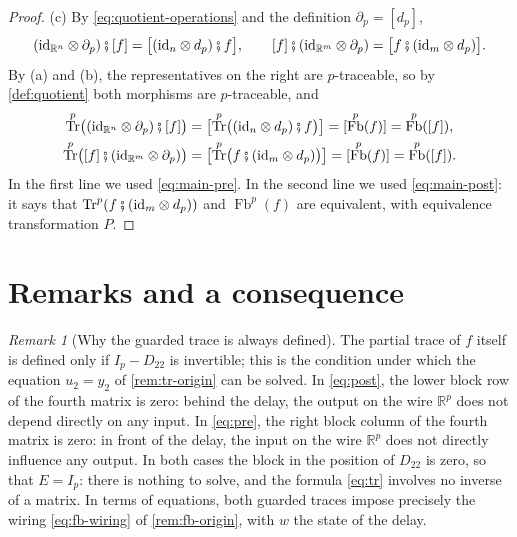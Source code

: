 \documentclass[11pt,a4paper]{article}
\theoremstyle{plain}
\theoremstyle{definition}
\theoremstyle{remark}
\newtheorem{remark}[theorem]{Remark}
\DeclareMathOperator{\Fb}{Fb}
\DeclareMathOperator{\Tr}{Tr}
\newcommand{\R}{\mathbb{R}}
\newcommand{\id}{\mathrm{id}}
\newcommand{\then}{\mathbin{\fatsemi}}
\begin{document}
\begin{proof}
    (c) By \cref{eq:quotient-operations} and the definition $\partial_p = [d_p]$,
    \begin{equation*}
        (\id_{\R^n} \otimes \partial_p) \then [f] = \bigl[ (\id_n \otimes d_p) \then f \bigr],
        \qquad
        [f] \then (\id_{\R^m} \otimes \partial_p) = \bigl[ f \then (\id_m \otimes d_p) \bigr] .
    \end{equation*}
    By (a) and (b), the representatives on the right are $p$-traceable, so by \cref{def:quotient} both morphisms are $p$-traceable, and
    \begin{align*}
        \Tr^p\bigl( (\id_{\R^n} \otimes \partial_p) \then [f] \bigr)
         & = \bigl[ \Tr^p\bigl( (\id_n \otimes d_p) \then f \bigr) \bigr]
        = [\Fb^p(f)] = \Fb^p([f]), \\
        \Tr^p\bigl( [f] \then (\id_{\R^m} \otimes \partial_p) \bigr)
         & = \bigl[ \Tr^p\bigl( f \then (\id_m \otimes d_p) \bigr) \bigr]
        = [\Fb^p(f)] = \Fb^p([f]) .
    \end{align*}
    In the first line we used \cref{eq:main-pre}.
    In the second line we used \cref{eq:main-post}: it says that $\Tr^p( f \then (\id_m \otimes d_p))$ and $\Fb^p(f)$ are equivalent, with equivalence transformation $P$.
\end{proof}

\section{Remarks and a consequence}

\begin{remark}[Why the guarded trace is always defined]
    The partial trace of $f$ itself is defined only if $I_p - D_{22}$ is invertible; this is the condition under which the equation $u_2 = y_2$ of \cref{rem:tr-origin} can be solved.
    In \cref{eq:post}, the lower block row of the fourth matrix is zero: behind the delay, the output on the wire $\R^p$ does not depend directly on any input.
    In \cref{eq:pre}, the right block column of the fourth matrix is zero: in front of the delay, the input on the wire $\R^p$ does not directly influence any output.
    In both cases the block in the position of $D_{22}$ is zero, so that $E = I_p$: there is nothing to solve, and the formula \cref{eq:tr} involves no inverse of a matrix.
    In terms of equations, both guarded traces impose precisely the wiring \cref{eq:fb-wiring} of \cref{rem:fb-origin}, with $w$ the state of the delay.
\end{remark}
\end{document}

